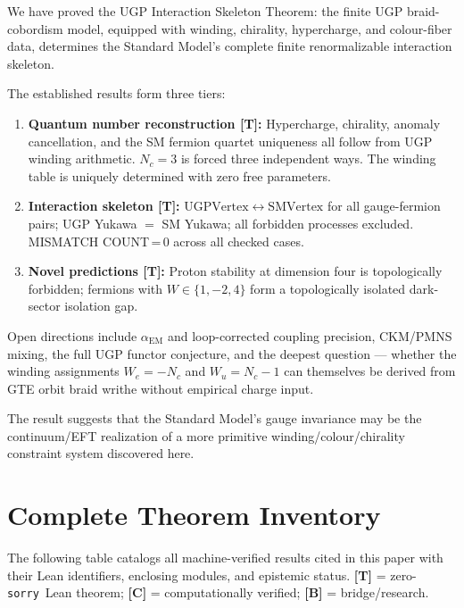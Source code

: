 \documentclass[12pt]{article}
\theoremstyle{remark}
\newcommand{\sorry}{\texttt{sorry}}
\begin{document}
We have proved the UGP Interaction Skeleton Theorem: the finite UGP
braid-cobordism model, equipped with winding, chirality, hypercharge, and
colour-fiber data, determines the Standard Model's complete finite renormalizable
interaction skeleton.

The established results form three tiers:
\begin{enumerate}
  \item \textbf{Quantum number reconstruction [T]:} Hypercharge, chirality,
    anomaly cancellation, and the SM fermion quartet uniqueness all follow from
    UGP winding arithmetic.  $N_c = 3$ is forced three independent ways.
    The winding table is uniquely determined with zero free parameters.
  \item \textbf{Interaction skeleton [T]:}
    $\mathrm{UGPVertex} \leftrightarrow \mathrm{SMVertex}$ for all gauge-fermion
    pairs; UGP Yukawa $=$ SM Yukawa; all forbidden processes excluded.
    MISMATCH COUNT\,=\,0 across all checked cases.
  \item \textbf{Novel predictions [T]:}
    Proton stability at dimension four is topologically forbidden; fermions with
    $W \in \{1,-2,4\}$ form a topologically isolated dark-sector isolation gap.
\end{enumerate}

Open directions include $\alpha_\mathrm{EM}$ and loop-corrected coupling precision, CKM/PMNS mixing,
the full UGP functor conjecture, and the deepest question --- whether the
winding assignments $W_e = -N_c$ and $W_u = N_c - 1$ can themselves be derived
from GTE orbit braid writhe without empirical charge input.

The result suggests that the Standard Model's gauge invariance may be the
continuum/EFT realization of a more primitive winding/colour/chirality
constraint system discovered here.

\appendix

\section{Complete Theorem Inventory}
\label{app:theorems}

The following table catalogs all machine-verified results cited in this paper
with their Lean identifiers, enclosing modules, and epistemic status.
\textbf{[T]} = zero-\sorry\ Lean theorem; \textbf{[C]} = computationally
verified; \textbf{[B]} = bridge/research.
\end{document}
